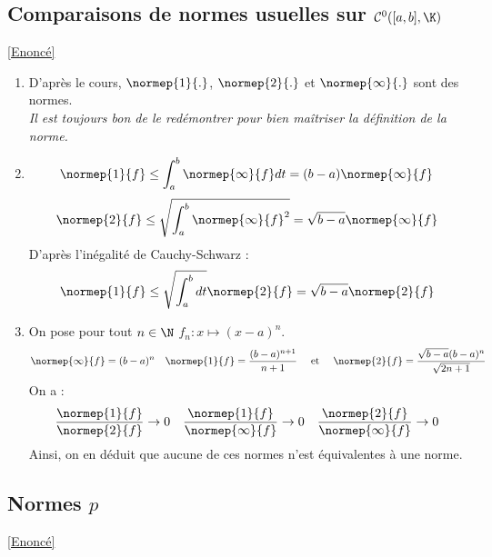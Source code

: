 \documentclass{book}
\begin{document}
		
	\subsection{Comparaisons de normes usuelles sur $\mathcal{C}^0([a,b],\K)$}\label{sec:comparaison-de-normes-usuelles-sur-mathcalc0abk}
		\textcolor{blue}{\hyperref[Comparaisons de normes usuelles sur C0]{[Enoncé]}}\\
		\begin{enumerate}
			\item D'après le cours, $\normep{1}{.}$, $\normep{2}{.}$ et $\normep{\infty}{.}$ sont des normes.\\ \textit{Il est toujours bon de le redémontrer pour bien maîtriser la définition de la norme.}
			\item \[\normep{1}{f}\leq\int_{a}^{b}\normep{\infty}{f}dt=(b-a)\normep{\infty}{f}\]
			\[\normep{2}{f}\leq \sqrt{\int_{a}^{b}\normep{\infty}{f}^2}=\sqrt{b-a}\normep{\infty}{f}\]
			D'après l'inégalité de Cauchy-Schwarz :
			\[\normep{1}{f}\leq\sqrt{\int_{a}^{b}dt}\normep{2}{f}=\sqrt{b-a}\normep{2}{f}\]
			\item On pose pour tout $n\in\N$ $f_n:x\mapsto (x-a)^n$.
			\[\normep{\infty}{f}=(b-a)^n\quad\normep{1}{f}=\frac{(b-a)^{n+1}}{n+1}\quad\text{ et }\quad \normep{2}{f}=\frac{\sqrt{b-a}(b-a)^n}{\sqrt{2n+1}}\]
			On a :
			\[\frac{\normep{1}{f}}{\normep{2}{f}}\to 0\quad \frac{\normep{1}{f}}{\normep{\infty}{f}}\to 0\quad \frac{\normep{2}{f}}{\normep{\infty}{f}}\to 0\]
			Ainsi, on en déduit que aucune de ces normes n'est équivalentes à une norme.
		\end{enumerate}
		
	\subsection{Normes $p$}\label{sec:normes-p}
		\textcolor{blue}{\hyperref[Normes p]{[Enoncé]}}
\end{document}
